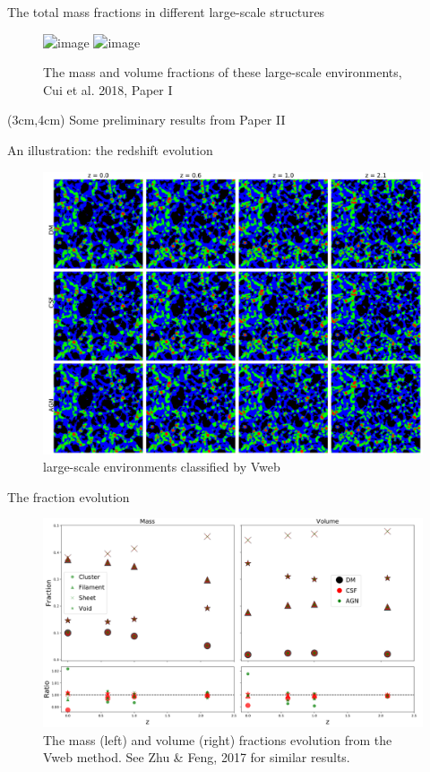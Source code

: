 \documentclass[aspectratio=43]{beamer}
\begin{document}
\begin{frame}{The total mass fractions in different large-scale structures}
  \begin{figure}
    \includegraphics<1>[width=\linewidth]{Fractions-BE}
    \includegraphics<2>[width=\linewidth]{Fractions-gasweb}
    \caption{The mass and volume fractions of these large-scale environments, Cui et al. 2018, Paper I}
  \end{figure}
\end{frame}

\begin{frame}
  \begin{textblock*}{8cm}(3cm,4cm)
    {\Huge Some preliminary results from Paper II}
  \end{textblock*}
\end{frame}

\begin{frame}{An illustration: the redshift evolution}
  \begin{figure}
    \includegraphics[width=0.8\linewidth]{Evolution-illustriation}
    \caption{large-scale environments classified by Vweb}
  \end{figure}
\end{frame}

\begin{frame}{The fraction evolution}
  \begin{figure}
    \includegraphics[width=0.9\linewidth]{Vweb-fraction-evolution.png}
    \caption{The mass (left) and volume (right) fractions evolution from the Vweb method. See Zhu \& Feng, 2017 for similar results.}
  \end{figure}
\end{frame}
\end{document}
